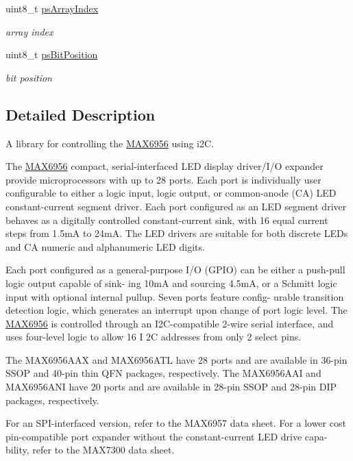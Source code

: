 \begin{DoxyCompactItemize}
uint8\-\_\-t \hyperlink{classMAX6956_a967e25fac00c0ab59be854289eb36353}{ps\-Array\-Index}
\begin{DoxyCompactList}\small\item\em array index \end{DoxyCompactList}\item 
uint8\-\_\-t \hyperlink{classMAX6956_a92b5dc05a1483c49c150db13dcd1f283}{ps\-Bit\-Position}
\begin{DoxyCompactList}\small\item\em bit position \end{DoxyCompactList}\end{DoxyCompactItemize}


\subsection{Detailed Description}
A library for controlling the \hyperlink{classMAX6956}{M\-A\-X6956} using i2\-C.

The \hyperlink{classMAX6956}{M\-A\-X6956} compact, serial-\/interfaced L\-E\-D display driver/\-I/\-O expander provide microprocessors with up to 28 ports. Each port is individually user configurable to either a logic input, logic output, or common-\/anode (C\-A) L\-E\-D constant-\/current segment driver. Each port configured as an L\-E\-D segment driver behaves as a digitally controlled constant-\/current sink, with 16 equal current steps from 1.\-5m\-A to 24m\-A. The L\-E\-D drivers are suitable for both discrete L\-E\-Ds and C\-A numeric and alphanumeric L\-E\-D digits.

Each port configured as a general-\/purpose I/\-O (G\-P\-I\-O) can be either a push-\/pull logic output capable of sink-\/ ing 10m\-A and sourcing 4.\-5m\-A, or a Schmitt logic input with optional internal pullup. Seven ports feature config-\/ urable transition detection logic, which generates an interrupt upon change of port logic level. The \hyperlink{classMAX6956}{M\-A\-X6956} is controlled through an I2\-C-\/compatible 2-\/wire serial interface, and uses four-\/level logic to allow 16 I 2\-C addresses from only 2 select pins.

The M\-A\-X6956\-A\-A\-X and M\-A\-X6956\-A\-T\-L have 28 ports and are available in 36-\/pin S\-S\-O\-P and 40-\/pin thin Q\-F\-N packages, respectively. The M\-A\-X6956\-A\-A\-I and M\-A\-X6956\-A\-N\-I have 20 ports and are available in 28-\/pin S\-S\-O\-P and 28-\/pin D\-I\-P packages, respectively.

For an S\-P\-I-\/interfaced version, refer to the M\-A\-X6957 data sheet. For a lower cost pin-\/compatible port expander without the constant-\/current L\-E\-D drive capa-\/ bility, refer to the M\-A\-X7300 data sheet.



